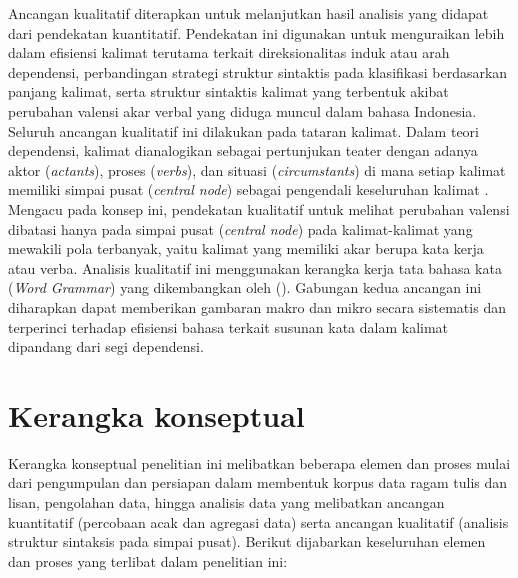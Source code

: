 Ancangan kualitatif diterapkan untuk melanjutkan hasil analisis yang didapat dari pendekatan kuantitatif. Pendekatan ini digunakan untuk menguraikan lebih dalam efisiensi kalimat terutama terkait direksionalitas induk atau  arah dependensi, perbandingan strategi struktur sintaktis pada klasifikasi berdasarkan panjang kalimat, serta struktur sintaktis kalimat yang terbentuk akibat perubahan valensi akar verbal yang diduga muncul dalam bahasa Indonesia. Seluruh ancangan kualitatif ini dilakukan pada tataran kalimat. Dalam teori dependensi, kalimat dianalogikan sebagai pertunjukan teater dengan adanya aktor (\textit{actants}), proses (\textit{verbs}), dan situasi (\textit{circumstants}) di mana setiap kalimat memiliki simpai pusat (\textit{central node}) sebagai pengendali keseluruhan kalimat \citep{tesniere1959elements}. Mengacu pada konsep ini, pendekatan kualitatif untuk melihat perubahan valensi dibatasi hanya pada simpai pusat (\textit{central node}) pada kalimat-kalimat yang mewakili pola terbanyak, yaitu kalimat yang memiliki akar berupa kata kerja atau verba. Analisis kualitatif ini menggunakan kerangka kerja tata bahasa kata (\textit{Word Grammar}) yang dikembangkan oleh (\citealp{hudson1984word,hudson2007language}). Gabungan kedua ancangan ini diharapkan dapat memberikan gambaran makro dan mikro secara sistematis dan terperinci terhadap efisiensi bahasa terkait susunan kata dalam kalimat dipandang dari segi dependensi. 



\section{Kerangka konseptual}
Kerangka konseptual penelitian ini melibatkan beberapa elemen dan proses mulai dari pengumpulan dan persiapan dalam membentuk korpus data ragam tulis dan lisan, pengolahan data, hingga analisis data yang melibatkan ancangan kuantitatif (percobaan acak dan agregasi data) serta ancangan kualitatif (analisis struktur sintaksis pada simpai pusat). Berikut dijabarkan keseluruhan elemen dan proses yang terlibat dalam penelitian ini:

